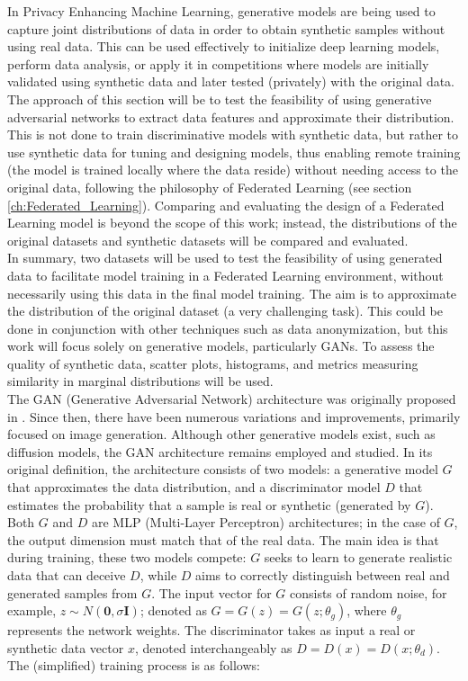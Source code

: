 In Privacy Enhancing Machine Learning, generative models are being used to capture joint distributions of data in order to obtain synthetic samples without using real data. This can be used effectively to initialize deep learning models, perform data analysis, or apply it in competitions where models are initially validated using synthetic data and later tested (privately) with the original data.\\
The approach of this section will be to test the feasibility of using generative adversarial networks to extract data features and approximate their distribution. This is not done to train discriminative models with synthetic data, but rather to use synthetic data for tuning and designing models, thus enabling remote training (the model is trained locally where the data reside) without needing access to the original data, following the philosophy of Federated Learning (see section \ref{ch:Federated_Learning}). Comparing and evaluating the design of a Federated Learning model is beyond the scope of this work; instead, the distributions of the original datasets and synthetic datasets will be compared and evaluated.\\
In summary, two datasets will be used to test the feasibility of using generated data to facilitate model training in a Federated Learning environment, without necessarily using this data in the final model training. The aim is to approximate the distribution of the original dataset (a very challenging task). This could be done in conjunction with other techniques such as data anonymization, but this work will focus solely on generative models, particularly GANs. To assess the quality of synthetic data, scatter plots, histograms, and metrics measuring similarity in marginal distributions will be used.\\
The GAN (Generative Adversarial Network) architecture was originally proposed in \cite{goodfellow2014}. Since then, there have been numerous variations and improvements, primarily focused on image generation. Although other generative models exist, such as diffusion models, the GAN architecture remains employed and studied. In its original definition, the architecture consists of two models: a generative model $G$ that approximates the data distribution, and a discriminator model $D$ that estimates the probability that a sample is real or synthetic (generated by $G$). Both $G$ and $D$ are MLP (Multi-Layer Perceptron) architectures; in the case of $G$, the output dimension must match that of the real data. The main idea is that during training, these two models compete: $G$ seeks to learn to generate realistic data that can deceive $D$, while $D$ aims to correctly distinguish between real and generated samples from $G$. The input vector for $G$ consists of random noise, for example, $z \sim N(\mathbf{0}, \sigma \mathbf{I})$; denoted as $G = G(z) = G(z; \theta_g)$, where $\theta_g$ represents the network weights. The discriminator takes as input a real or synthetic data vector $x$, denoted interchangeably as $D = D(x) = D(x; \theta_d)$. The (simplified) training process is as follows:\\
